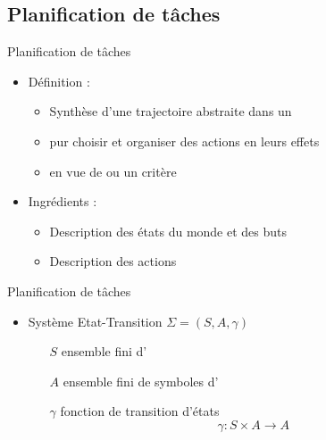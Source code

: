 \documentclass[compress]{beamer}
\begin{document}
\subsection{Planification de tâches}
\begin{frame}{Planification de tâches}
\begin{itemize}
\item Définition :
	\begin{itemize}
	\item Synthèse d'une trajectoire abstraite dans un 
	\item pur choisir et organiser des actions en  leurs effets
	\item en vue de  ou un critère
	\end{itemize}
\item Ingrédients :
	\begin{itemize}
	\item Description des états du monde et des buts
	\item Description des actions
	\end{itemize}
\end{itemize}
\end{frame}

\begin{frame}{Planification de tâches}
\begin{itemize}
\item Système Etat-Transition $\Sigma = (S,A,\gamma)$
	\begin{itemize}
	\item[$S$] ensemble fini d'
	\item[$A$] ensemble fini de symboles d'
	\item[$\gamma$] fonction de transition d'états
		$$\gamma: S \times A \rightarrow A$$
	\end{itemize}
\end{itemize}
\end{frame}
\end{document}
